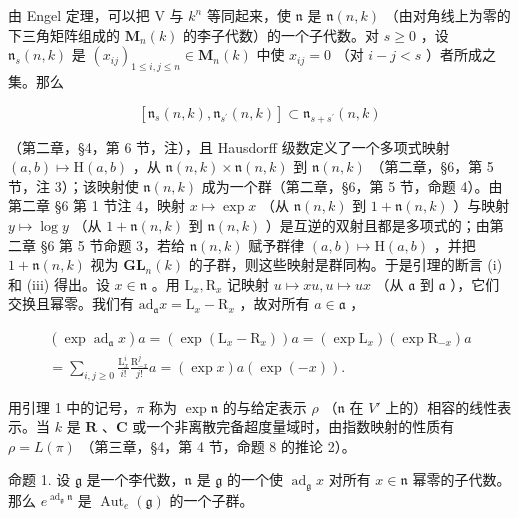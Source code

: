由 Engel 定理，可以把 V 与 \(k^n\) 等同起来，使 \(\mathfrak{n}\) 是 \(\mathfrak{n}(n,k)\) （由对角线上为零的下三角矩阵组成的 \(\mathbf{M}_n(k)\) 的李子代数）的一个子代数。对 \(s \geq 0\) ，设 \(\mathfrak{n}_s(n,k)\) 是 \((x_{ij})_{1 \leq i,j \leq n} \in \mathbf{M}_n(k)\) 中使 \(x_{ij} = 0\) （对 \(i - j < s\) ）者所成之集。那么

\[
[ \mathfrak {n} _ {s} (n, k), \mathfrak {n} _ {s ^ {\prime}} (n, k) ] \subset \mathfrak {n} _ {s + s ^ {\prime}} (n, k)
\]

（第二章，§4，第 6 节，注），且 Hausdorff 级数定义了一个多项式映射 \((a,b)\mapsto\mathrm{H}(a,b)\) ，从 \(\mathfrak{n}(n,k)\times\mathfrak{n}(n,k)\) 到 \(\mathfrak{n}(n,k)\) （第二章，§6，第 5 节，注 3）；该映射使 \(\mathfrak{n}(n,k)\) 成为一个群（第二章，§6，第 5 节，命题 4）。由第二章 §6 第 1 节注 4，映射 \(x\mapsto\exp x\) （从 \(\mathfrak{n}(n,k)\) 到 \(1+\mathfrak{n}(n,k)\) ）与映射 \(y\mapsto\log y\) （从 \(1+\mathfrak{n}(n,k)\) 到 \(\mathfrak{n}(n,k)\) ）是互逆的双射且都是多项式的；由第二章 §6 第 5 节命题 3，若给 \(\mathfrak{n}(n,k)\) 赋予群律 \((a,b)\mapsto\mathrm{H}(a,b)\) ，并把 \(1+\mathfrak{n}(n,k)\) 视为 \(\mathbf{GL}_{n}(k)\) 的子群，则这些映射是群同构。于是引理的断言 (i) 和 (iii) 得出。设 \(x\in\mathfrak{n}\) 。用 \(\mathrm{L}_{x},\mathrm{R}_{x}\) 记映射 \(u\mapsto xu,u\mapsto ux\) （从 \(\mathfrak{a}\) 到 \(\mathfrak{a}\) ），它们交换且幂零。我们有 \(\mathrm{ad}_{\mathfrak{a}}x=\mathrm{L}_{x}-\mathrm{R}_{x}\) ，故对所有 \(a\in\mathfrak{a}\) ，

\[
\begin{array}{c} (\exp \operatorname{ad} _ {\mathfrak {a}} x) a = (\exp (\mathrm{L} _ {x} - \mathrm{R} _ {x})) a = (\exp \mathrm{L} _ {x}) (\exp \mathrm{R} _ {- x}) a \\ = \sum_ {i, j \geq 0} \frac {\mathrm{L} _ {x} ^ {i}}{i !} \frac {\mathrm{R} _ {- x} ^ {j}}{j !} a = (\exp x) a (\exp (- x)). \end{array}\tag{1}
\]

用引理 1 中的记号，\(\pi\) 称为 \(\exp \mathfrak{n}\) 的与给定表示 \(\rho\) （\(\mathfrak{n}\) 在 \(V'\) 上的）相容的线性表示。当 \(k\) 是 \(\mathbf{R}\) 、\(\mathbf{C}\) 或一个非离散完备超度量域时，由指数映射的性质有 \(\rho = L(\pi)\) （第三章，§4，第 4 节，命题 8 的推论 2）。

命题 1. 设 \(\mathfrak{g}\) 是一个李代数，\(\mathfrak{n}\) 是 \(\mathfrak{g}\) 的一个使 \(\operatorname{ad}_{\mathfrak{g}}x\) 对所有 \(x\in \mathfrak{n}\) 幂零的子代数。那么 \(e^{\operatorname{ad}_{\mathfrak{g}}\mathfrak{n}}\) 是 \(\operatorname{Aut}_e(\mathfrak{g})\) 的一个子群。

